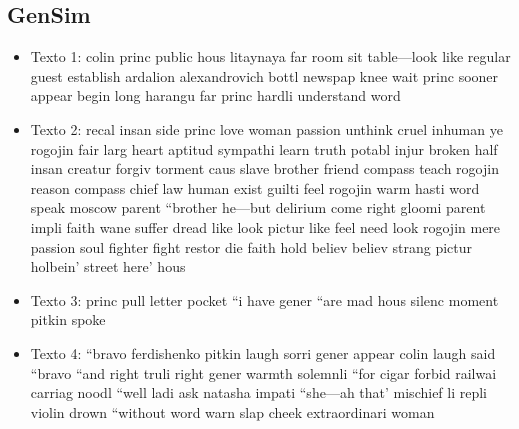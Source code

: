 \documentclass[a4paper,twocolumn]{article}
\begin{document}
    \subsection{GenSim}\label{subsec:gensim_out}
    \begin{itemize}
        \item Texto 1: colin princ public hous litaynaya far room sit table—look like regular guest establish ardalion alexandrovich bottl newspap knee wait princ sooner appear begin long harangu far princ hardli understand word
        \item Texto 2: recal insan side princ love woman passion unthink cruel inhuman ye rogojin fair larg heart aptitud sympathi learn truth potabl injur broken half insan creatur forgiv torment caus slave brother friend compass teach rogojin reason compass chief law human exist guilti feel rogojin warm hasti word speak moscow parent “brother he—but delirium come right gloomi parent impli faith wane suffer dread like look pictur like feel need look rogojin mere passion soul fighter fight restor die faith hold believ believ strang pictur holbein’ street here’ hous
        \item Texto 3: princ pull letter pocket “i have gener “are mad hous silenc moment pitkin spoke
        \item Texto 4: “bravo ferdishenko pitkin laugh sorri gener appear colin laugh said “bravo “and right truli right gener warmth solemnli “for cigar forbid railwai carriag noodl “well ladi ask natasha impati “she—ah that’ mischief li repli violin drown “without word warn slap cheek extraordinari woman
    \end{itemize}
\end{document}
